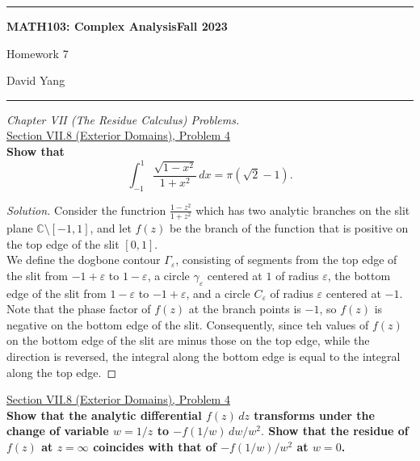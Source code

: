 \documentclass[11pt]{article}
\newenvironment{solution}
  {\renewcommand\qedsymbol{$\blacksquare$}\begin{proof}[Solution]}
  {\end{proof}}
\theoremstyle{definition}
\begin{document}
	\hrule
	\begin{center}
        \textbf{MATH103: Complex Analysis}\hfill \textbf{Fall 2023}\newline


		{\Large Homework 7}

		David Yang
	\end{center}

\hrule

\vspace{1em}


\textit{Chapter VII (The Residue Calculus) Problems.} \\

\underline{Section VII.8 (Exterior Domains), Problem 4}\\

\textbf{Show that}
\[ \int_{-1}^1 \frac{\sqrt{1-x^2}}{1+x^2} \, dx = \pi(\sqrt{2} - 1).\]

\begin{solution}
Consider the functrion $\frac{1-z^2}{1+z^2}$ which has two analytic branches on the slit plane $\mathbb{C} \setminus [-1, 1]$, and let $f(z)$ be the branch of the function that is positive on the top edge of the slit $[0, 1]$. \\

We define the dogbone contour $\Gamma_\varepsilon$, consisting of segments from the top edge of the slit from $ -1 + \varepsilon$ to $1-\varepsilon$, a circle $\gamma_\varepsilon$ centered at $1$ of radius $\varepsilon$,
the bottom edge of the slit from $1-\varepsilon$ to $-1+\varepsilon$, and a circle $C_{\varepsilon}$ of radius $\varepsilon$ centered at $-1$. \\

Note that the phase factor of $f(z)$ at the branch points is $-1$, so $f(z)$ is negative on the bottom edge of the slit. Consequently, since teh values of $f(z)$ on the bottom edge of the slit are minus those on the top edge, while the direction is reversed,
the integral along the bottom edge is equal to the integral along the top edge.
\end{solution}

\newpage

\underline{Section VII.8 (Exterior Domains), Problem 4}\\

\textbf{Show that the analytic differential $f(z) \, dz$ transforms under the change of variable $w=1/z$ to $-f(1/w) \, dw/w^2.$ Show that the residue of $f(z)$ at $z = \infty$
coincides with that of $-f(1/w)/w^2$ at $w=0$.} \\
\end{document}
